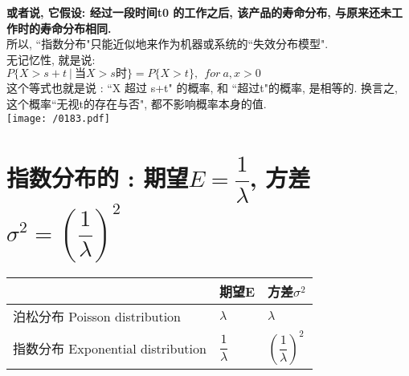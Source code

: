 \documentclass[UTF8]{ctexart}
\begin{document}
\textbf{或者说, 它假设: 经过一段时间t0 的工作之后, 该产品的寿命分布, 与原来还未工作时的寿命分布相同.} \\

所以, ``指数分布"只能近似地来作为机器或系统的``失效分布模型". \\
	
	
无记忆性, 就是说:	\\
$ \boxed{
P\{X>s+t\ |\ \text{当}X>s\text{时\}}=P\{X>t\},\ \ for\ a,x>0
}$ \\

这个等式也就是说 : ``X 超过 s+t" 的概率, 和 ``超过t"的概率, 是相等的. 换言之, 这个概率``无视t的存在与否", 都不影响概率本身的值. \\

\texttt{[image: /0183.pdf]}	
	
	
	
	
	
	
	
\section{指数分布的 : 期望$E=\dfrac{1} {\lambda}$,  方差$\sigma^2=(\dfrac{1} {\lambda})^2$}
	
	\begin{tabular}{|l|l|l|}
		\hline
		& 期望E  & 方差$\sigma^2$ \\
		\hline
		泊松分布 Poisson distribution &  $\lambda$ &  $\lambda$ \\
		\hline
		指数分布 Exponential distribution & $ \dfrac{1} {\lambda}$ & $ (\dfrac{1} {\lambda})^2$\\
		\hline
	\end{tabular}
	
	
	
	
	
	
	
	
	
	
	
	
	
	
	
	
	
	
	
\end{document}
